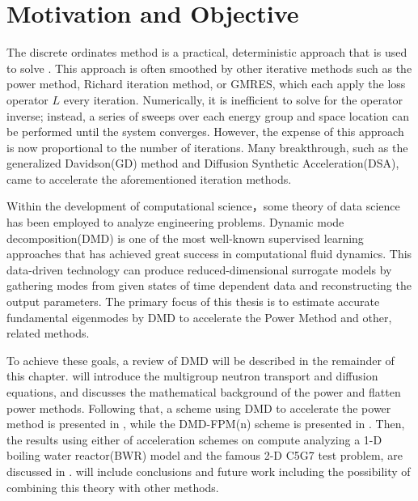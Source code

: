 \section{Motivation and Objective}
The discrete ordinates method is a practical, deterministic approach that is used to solve .
This approach is often smoothed by other iterative methods such as the power method, Richard iteration method, or GMRES, which each apply the loss operator $L$ every iteration.
Numerically, it is inefficient to solve for the operator inverse; instead, a series of sweeps over each energy group and space location can be performed until the system converges.  
However, the expense of this approach is now proportional to the number of iterations.
Many breakthrough, such as the generalized Davidson(GD) method\cite{larsen1984diffusion} and Diffusion Synthetic Acceleration(DSA)\cite{hamilton2011numerical}, came to accelerate the aforementioned iteration methods.

Within the development of computational science，some theory of data science has been employed to analyze engineering problems.
Dynamic mode decomposition(DMD) is one of the most well-known supervised learning approaches that has achieved great success in computational fluid dynamics.
This data-driven technology can produce reduced-dimensional surrogate models by gathering modes from given states of time dependent data and reconstructing the output parameters.
The primary focus of this thesis is to estimate accurate fundamental eigenmodes by DMD to accelerate the Power Method and other, related methods.

To achieve these goals, a review of DMD will be described in the remainder of this chapter.
 will introduce the multigroup neutron transport and diffusion equations, and  discusses the mathematical background of the power and flatten power methods.
Following that, a scheme using DMD to accelerate the power method is presented in , while the DMD-FPM(n) scheme is presented in .
Then, the results using either of acceleration schemes on compute analyzing a 1-D boiling water reactor(BWR) model and the famous 2-D C5G7 test problem, are discussed in .
 will include conclusions and future work including the possibility of combining this theory with other methods. 


